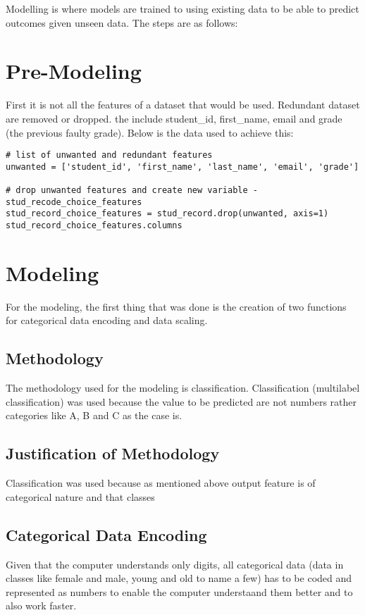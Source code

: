Modelling is where models are trained to using existing data to be able to predict outcomes given unseen data. The steps are as follows:

\section{Pre-Modeling}
First it is not all the features of a dataset that would be used. Redundant dataset are removed or dropped. the include student\_id, first\_name, email and grade (the previous faulty grade). 
Below is the data used to achieve this:

\begin{verbatim}
# list of unwanted and redundant features
unwanted = ['student_id', 'first_name', 'last_name', 'email', 'grade']

# drop unwanted features and create new variable - stud_recode_choice_features
stud_record_choice_features = stud_record.drop(unwanted, axis=1)
stud_record_choice_features.columns
\end{verbatim}

\section{Modeling}
For the modeling, the first thing that was done is the creation of two functions for categorical data encoding and data scaling. 
\subsection{Methodology}
The methodology used for the modeling is classification. Classification (multilabel classification) was used because the value to be predicted are not numbers rather categories like A, B and C as the case is.

\subsection{Justification of Methodology}
Classification was used because as mentioned above output feature is of categorical nature and that classes 

\subsection{Categorical Data Encoding}
Given that the computer understands only digits, all categorical data (data in classes like female and male, young and old to name a few) has to be coded and represented as numbers to enable the computer understaand them better and to also work faster. 

